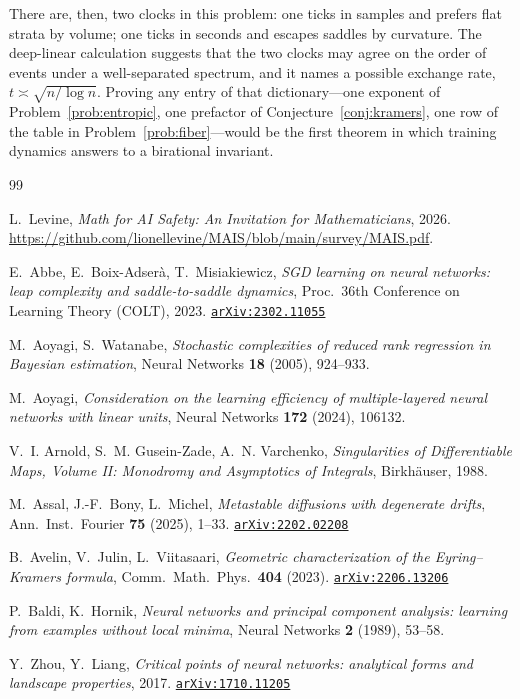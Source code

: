 \documentclass[11pt]{amsart}
\newcommand{\arxiv}[1]{\href{https://arxiv.org/abs/#1}{\texttt{arXiv:#1}}}
\theoremstyle{plain}
\theoremstyle{definition}
\begin{document}
There are, then, two clocks in this problem: one ticks in samples and prefers flat strata by volume; one ticks in seconds and escapes saddles by curvature. The deep-linear calculation suggests that the two clocks may agree on the order of events under a well-separated spectrum, and it names a possible exchange rate, $t \asymp \sqrt{n / \log n}$. Proving any entry of that dictionary---one exponent of Problem~\ref{prob:entropic}, one prefactor of Conjecture~\ref{conj:kramers}, one row of the table in Problem~\ref{prob:fiber}---would be the first theorem in which training dynamics answers to a birational invariant.

\begin{thebibliography}{99}

L.~Levine,
\emph{Math for AI Safety: An Invitation for Mathematicians},
2026. \url{https://github.com/lionellevine/MAIS/blob/main/survey/MAIS.pdf}.


E.~Abbe, E.~Boix-Adser\`a, T.~Misiakiewicz,
\emph{SGD learning on neural networks: leap complexity and saddle-to-saddle dynamics},
Proc.\ 36th Conference on Learning Theory (COLT), 2023.
\arxiv{2302.11055}

M.~Aoyagi, S.~Watanabe,
\emph{Stochastic complexities of reduced rank regression in Bayesian estimation},
Neural Networks \textbf{18} (2005), 924--933.

M.~Aoyagi,
\emph{Consideration on the learning efficiency of multiple-layered neural networks with linear units},
Neural Networks \textbf{172} (2024), 106132.

V.~I. Arnold, S.~M. Gusein-Zade, A.~N. Varchenko,
\emph{Singularities of Differentiable Maps, Volume II: Monodromy and Asymptotics of Integrals},
Birkh\"auser, 1988.

M.~Assal, J.-F.~Bony, L.~Michel,
\emph{Metastable diffusions with degenerate drifts},
Ann.\ Inst.\ Fourier \textbf{75} (2025), 1--33.
\arxiv{2202.02208}

B.~Avelin, V.~Julin, L.~Viitasaari,
\emph{Geometric characterization of the Eyring--Kramers formula},
Comm.\ Math.\ Phys.\ \textbf{404} (2023).
\arxiv{2206.13206}

P.~Baldi, K.~Hornik,
\emph{Neural networks and principal component analysis: learning from examples without local minima},
Neural Networks \textbf{2} (1989), 53--58.

Y.~Zhou, Y.~Liang,
\emph{Critical points of neural networks: analytical forms and landscape properties},
2017. \arxiv{1710.11205}


\end{thebibliography}
\end{document}
